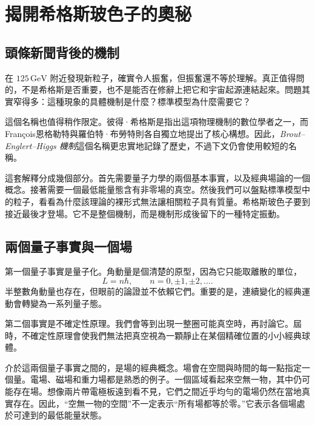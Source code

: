 \chapter{揭開希格斯玻色子的奧秘}


\section{頭條新聞背後的機制}

在 $125\,\mathrm{GeV}$ 附近發現新粒子，確實令人振奮，但振奮還不等於理解。真正值得問的，不是希格斯是否重要，也不是能否在修辭上把它和宇宙起源連結起來。問題其實窄得多：這種現象的具體機制是什麼？標準模型為什麼需要它？

這個名稱也值得稍作限定。彼得·希格斯是指出這項物理機制的數位學者之一，而Fran\c{c}ois恩格勒特與羅伯特·布勞特則各自獨立地提出了核心構想。因此，\emph{Brout--Englert--Higgs 機制}這個名稱更忠實地記錄了歷史，不過下文仍會使用較短的名稱。

這套解釋分成幾個部分。首先需要量子力學的兩個基本事實，以及經典場論的一個概念。接著需要一個最低能量態含有非零場的真空。然後我們可以盤點標準模型中的粒子，看看為什麼該理論的裸形式無法讓相關粒子具有質量。希格斯玻色子要到接近最後才登場。它不是整個機制，而是機制形成後留下的一種特定振動。

\section{兩個量子事實與一個場}

第一個量子事實是量子化。角動量是個清楚的原型，因為它只能取離散的單位，
\begin{equation}
L=n\hbar,
\qquad
n=0,\pm1,\pm2,\ldots .
\end{equation}
半整數角動量也存在，但眼前的論證並不依賴它們。重要的是，連續變化的經典運動會轉變為一系列量子態。

第二個事實是不確定性原理。我們會等到出現一整圈可能真空時，再討論它。屆時，不確定性原理會使我們無法把真空視為一顆靜止在某個精確位置的小小經典球體。

介於這兩個量子事實之間的，是場的經典概念。場會在空間與時間的每一點指定一個量。電場、磁場和重力場都是熟悉的例子。一個區域看起來空無一物，其中仍可能存在場。想像兩片帶電極板遠到看不見，它們之間近乎均勻的電場仍然在當地真實存在。因此，``空無一物的空間''不一定表示``所有場都等於零。''它表示各個場處於可達到的最低能量狀態。

